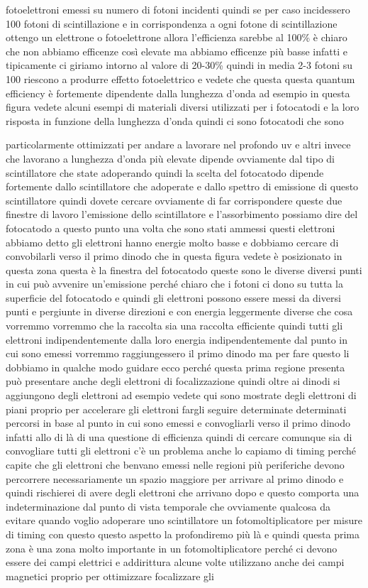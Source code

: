 {fotoelettroni emessi su numero di fotoni incidenti quindi se per caso incidessero 100 fotoni di scintillazione e in corrispondenza a ogni fotone di scintillazione ottengo un elettrone o fotoelettrone allora l'efficienza sarebbe al 100\% è chiaro che non abbiamo efficenze così elevate ma abbiamo efficenze più basse infatti e tipicamente ci giriamo intorno al valore di 20-30\% quindi in media 2-3 fotoni su 100 riescono a produrre effetto fotoelettrico e vedete che questa questa quantum efficiency è fortemente dipendente dalla lunghezza d'onda ad esempio in questa figura vedete alcuni esempi di materiali diversi utilizzati per i fotocatodi e la loro risposta in funzione della lunghezza d'onda quindi ci sono fotocatodi che sono 

particolarmente ottimizzati per andare a lavorare nel profondo uv e altri invece che lavorano a lunghezza d'onda più elevate dipende ovviamente dal tipo di scintillatore che state adoperando quindi la scelta del fotocatodo dipende fortemente dallo scintillatore che adoperate e dallo spettro di emissione di questo scintillatore quindi dovete cercare ovviamente di far corrispondere queste due finestre di lavoro l'emissione dello scintillatore e l'assorbimento possiamo dire del fotocatodo a questo punto una volta che sono stati ammessi questi elettroni abbiamo detto gli elettroni hanno energie molto basse e dobbiamo cercare di convobilarli verso il primo dinodo che in questa figura vedete è posizionato in questa zona questa è la finestra del fotocatodo queste sono le diverse diversi punti in cui può avvenire un'emissione perché chiaro che i fotoni ci dono su tutta la superficie del fotocatodo e quindi gli elettroni possono essere messi da diversi punti e pergiunte in diverse direzioni e con energia leggermente diverse che cosa vorremmo vorremmo che la raccolta sia una raccolta efficiente quindi tutti gli elettroni indipendentemente dalla loro energia indipendentemente dal punto in cui sono emessi vorremmo raggiungessero il primo dinodo ma per fare questo li dobbiamo in qualche modo guidare ecco perché questa prima regione presenta può presentare anche degli elettroni di focalizzazione quindi oltre ai dinodi si aggiungono degli elettroni ad esempio vedete qui sono mostrate degli elettroni di piani proprio per accelerare gli elettroni fargli seguire determinate determinati percorsi in base al punto in cui sono emessi e convogliarli verso il primo dinodo infatti allo di là di una questione di efficienza quindi di cercare comunque sia di convogliare tutti gli elettroni c'è un problema anche lo capiamo di timing perché capite che gli elettroni che benvano emessi nelle regioni più periferiche devono percorrere necessariamente un spazio maggiore per arrivare al primo dinodo e quindi rischierei di avere degli elettroni che arrivano dopo e questo comporta una indeterminazione dal punto di vista temporale che ovviamente qualcosa da evitare quando voglio adoperare uno scintillatore un fotomoltiplicatore per misure di timing con questo questo aspetto la profondiremo più là e quindi questa prima zona è una zona molto importante in un fotomoltiplicatore perché ci devono essere dei campi elettrici e addirittura alcune volte utilizzano anche dei campi magnetici proprio per ottimizzare focalizzare gli }
